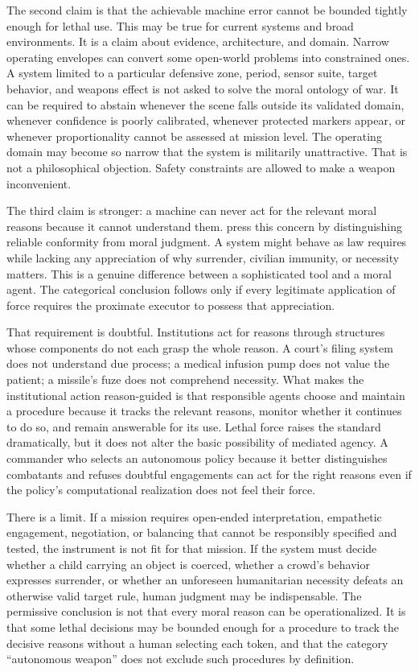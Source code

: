 \documentclass[11pt]{article}
\begin{document}
The second claim is that the achievable machine error cannot be bounded tightly enough for lethal use. This may be true for current systems and broad environments. It is a claim about evidence, architecture, and domain. Narrow operating envelopes can convert some open-world problems into constrained ones. A system limited to a particular defensive zone, period, sensor suite, target behavior, and weapons effect is not asked to solve the moral ontology of war. It can be required to abstain whenever the scene falls outside its validated domain, whenever confidence is poorly calibrated, whenever protected markers appear, or whenever proportionality cannot be assessed at mission level. The operating domain may become so narrow that the system is militarily unattractive. That is not a philosophical objection. Safety constraints are allowed to make a weapon inconvenient.

The third claim is stronger: a machine can never act for the relevant moral reasons because it cannot understand them. \citet{purves2015} press this concern by distinguishing reliable conformity from moral judgment. A system might behave as law requires while lacking any appreciation of why surrender, civilian immunity, or necessity matters. This is a genuine difference between a sophisticated tool and a moral agent. The categorical conclusion follows only if every legitimate application of force requires the proximate executor to possess that appreciation.

That requirement is doubtful. Institutions act for reasons through structures whose components do not each grasp the whole reason. A court's filing system does not understand due process; a medical infusion pump does not value the patient; a missile's fuze does not comprehend necessity. What makes the institutional action reason-guided is that responsible agents choose and maintain a procedure because it tracks the relevant reasons, monitor whether it continues to do so, and remain answerable for its use. Lethal force raises the standard dramatically, but it does not alter the basic possibility of mediated agency. A commander who selects an autonomous policy because it better distinguishes combatants and refuses doubtful engagements can act for the right reasons even if the policy's computational realization does not feel their force.

There is a limit. If a mission requires open-ended interpretation, empathetic engagement, negotiation, or balancing that cannot be responsibly specified and tested, the instrument is not fit for that mission. If the system must decide whether a child carrying an object is coerced, whether a crowd's behavior expresses surrender, or whether an unforeseen humanitarian necessity defeats an otherwise valid target rule, human judgment may be indispensable. The permissive conclusion is not that every moral reason can be operationalized. It is that some lethal decisions may be bounded enough for a procedure to track the decisive reasons without a human selecting each token, and that the category ``autonomous weapon'' does not exclude such procedures by definition.
\end{document}
